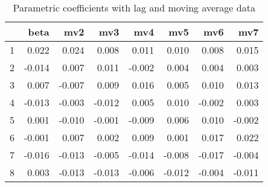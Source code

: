 \documentclass[a4paper, 12pt]{article}
\begin{document}
\begin{table}[h]
\centering
\caption{Parametric coefficients with lag and moving average data}
\begin{tabular}{rrrrrrrr}
  \hline
 & beta & mv2 & mv3 & mv4 & mv5 & mv6 & mv7 \\
  \hline
1 & 0.022 & 0.024 & 0.008 & 0.011 & 0.010 & 0.008 & 0.015 \\
  2 & -0.014 & 0.007 & 0.011 & -0.002 & 0.004 & 0.004 & 0.003 \\
  3 & 0.007 & -0.007 & 0.009 & 0.016 & 0.005 & 0.010 & 0.013 \\
  4 & -0.013 & -0.003 & -0.012 & 0.005 & 0.010 & -0.002 & 0.003 \\
  5 & 0.001 & -0.010 & -0.001 & -0.009 & 0.006 & 0.010 & -0.002 \\
  6 & -0.001 & 0.007 & 0.002 & 0.009 & 0.001 & 0.017 & 0.022 \\
  7 & -0.016 & -0.013 & -0.005 & -0.014 & -0.008 & -0.017 & -0.004 \\
  8 & 0.003 & -0.013 & -0.013 & -0.006 & -0.012 & -0.004 & -0.011 \\
   \hline
\end{tabular}
\end{table}
\clearpage
\end{document}

